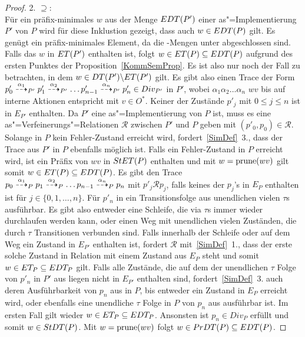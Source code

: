 \begin{proof}
  2. \glqq$\supseteq$\grqq{}:\\
  Für ein präfix-minimales $w$ aus der Menge $EDT (P')$ einer
  as"=Implementierung $P'$ von $P$ wird für diese Inklustion gezeigt, dass auch
  $w\in EDT (P)$ gilt. Es genügt ein präfix-minimales Element, da die
  \EDT{}-Mengen unter \cont{} abgeschlossen sind. Falls das $w$ in $ET (P')$
  enthalten ist, folgt $w\in ET (P) \subseteq EDT (P)$ aufgrund des ersten
  Punktes der Proposition~\ref{KommSemProp}. Es ist also nur noch der Fall zu
  betrachten, in dem $w\in DT (P') \backslash ET (P')$ gilt. Es gibt also
  einen Trace der Form $p'_0 \may[\alpha _1]_{P'} p'_1 \may[\alpha _2]_{P'}
  \dots p'_{n-1} \may[\alpha _n]_{P'} p'_n\in Div _{P'}$ in $P'$, wobei $\alpha
  _1\alpha _2\dots\alpha _n$ $wv$ bis auf interne Aktionen entspricht mit $v\in
  O^*$. Keiner der Zustände $p'_j$ mit $0\leq j \leq n$ ist in $E_{P'}$
  enthalten. Da $P'$ eine as"=Implementierung von $P$ ist, muss es eine
  as"=Verfeinerungs"=Relationen $\mathcal{R}$ zwischen $P'$ und $P$ geben mit
  $(p'_0,p_0) \in\mathcal{R}$. Solange in $P$ kein Fehler-Zustand erreicht
  wird, fordert~\ref{SimDef}~3., dass der Trace aus $P'$ in $P$ ebenfalls
  möglich ist. Falls ein Fehler-Zustand in $P$ erreicht wird, ist ein Präfix
  von $wv$ in $StET (P)$ enthalten und mit $w =\mathrm{prune} (wv)$ gilt somit $w\in
  ET (P) \subseteq EDT(P)$. Es gibt den Trace $p_0 \may[\alpha _1]_P p_1
  \may[\alpha _2]_P \dots p_{n-1} \may[\alpha _n]_P p_n$ mit $p'_j\mathcal{R}
  p_j$, falls keines der $p_j$'s in $E_P$ enthalten ist für $j\in\{0,1,\dots
  ,n\}$. Für $p'_n$ in ein Transitionsfolge aus unendlichen vielen $\tau$s
  ausführbar. Es gibt also entweder eine Schleife, die via $\tau$s immer wieder
  durchlaufen werden kann, oder einen Weg mit unendlichen vielen Zuständen, die
  durch $\tau$ Transitionen verbunden sind. Falls innerhalb der Schleife oder
  auf dem Weg ein Zustand in $E_{P'}$ enthalten ist, fordert $\mathcal{R}$
  mit~\ref{SimDef}~1., dass der erste solche Zustand in Relation mit einem
  Zustand aus $E_P$ steht und somit $w \in ET _P \subseteq EDT _P$ gilt.
  Falls alle Zustände, die auf dem der unendlichen $\tau$ Folge von $p'_n$ in
  $P'$ aus liegen nicht in $E_{P'}$ enthalten sind, fordert~\ref{SimDef}~3.
  auch deren Ausführbarkeit von $p_n$ aus in $P$, bis entweder ein Zustand in
  $E_P$ erreicht wird, oder ebenfalls eine unendliche $\tau$ Folge in $P$ von
  $p_n$ aus ausführbar ist. Im ersten Fall gilt wieder $w \in ET _P \subseteq
  EDT _P$. Ansonsten ist $p_n\in Div _P$ erfüllt und somit $w\in StDT (P)$.
  Mit $w=\mathrm{prune} (wv)$ folgt $w\in PrDT (P) \subseteq EDT (P)$.


\end{proof}
